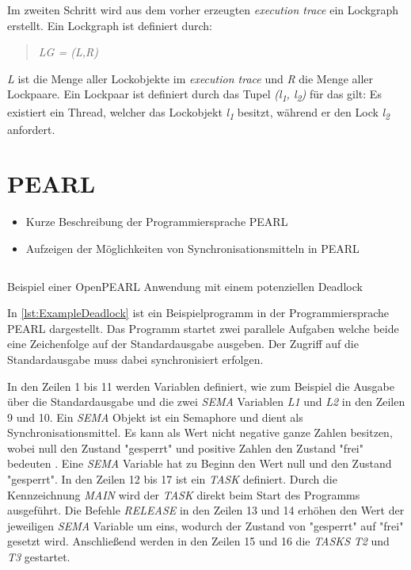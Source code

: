 Im zweiten Schritt wird aus dem vorher erzeugten \textit{execution trace} ein
Lockgraph erstellt. Ein Lockgraph ist definiert durch:
\begin{quote}
\textit{LG = (L,R)}
\end{quote}
\textit{L} ist die Menge aller Lockobjekte im \textit{execution trace} und
\textit{R} die Menge aller Lockpaare. Ein Lockpaar ist definiert durch das Tupel
\textit{(l\textsubscript{1}, l\textsubscript{2})} für das gilt: Es existiert ein
Thread, welcher das Lockobjekt \textit{l\textsubscript{1}} besitzt, während er
den Lock \textit{l\textsubscript{2}} anfordert.

\section{PEARL}
\label{section:PEARL}
\begin{itemize}
    \item Kurze Beschreibung der Programmiersprache PEARL
    \item Aufzeigen der Möglichkeiten von Synchronisationsmitteln in PEARL
\end{itemize}

\begin{listing}[ht]
  \inputminted[frame=lines,linenos]{vim}{./Examples/Example_Deadlock.prl}
  \caption{Beispiel einer OpenPEARL Anwendung mit einem potenziellen Deadlock}    
  \label{lst:ExampleDeadlock}   
\end{listing} 

In \cref{lst:ExampleDeadlock} ist ein Beispielprogramm in der Programmiersprache
PEARL dargestellt. Das Programm startet zwei parallele Aufgaben welche beide eine Zeichenfolge auf der Standardausgabe ausgeben. Der Zugriff auf die Standardausgabe muss dabei synchronisiert erfolgen.

In den Zeilen 1 bis 11 werden Variablen definiert, wie zum Beispiel die Ausgabe über die Standardausgabe und die zwei \textit{SEMA} Variablen \textit{L1} und \textit{L2} in den Zeilen 9 und 10. Ein \textit{SEMA} Objekt ist ein Semaphore und dient als Synchronisationsmittel. Es kann als Wert nicht negative ganze Zahlen besitzen, wobei null den Zustand "gesperrt" und positive Zahlen den Zustand "frei" bedeuten \autocite[9--17]{PEARL}. Eine \textit{SEMA} Variable hat zu Beginn den Wert null und den Zustand "gesperrt". In den Zeilen 12 bis 17 ist ein \textit{TASK} definiert. Durch die Kennzeichnung \textit{MAIN} wird der \textit{TASK} direkt beim Start des Programms ausgeführt. Die Befehle \textit{RELEASE} in den Zeilen 13 und 14 erhöhen den Wert der jeweiligen \textit{SEMA} Variable um eins, wodurch der Zustand von "gesperrt" auf "frei" gesetzt wird. Anschließend werden in den Zeilen 15 und 16 die \textit{TASKS} \textit{T2} und \textit{T3} gestartet.

